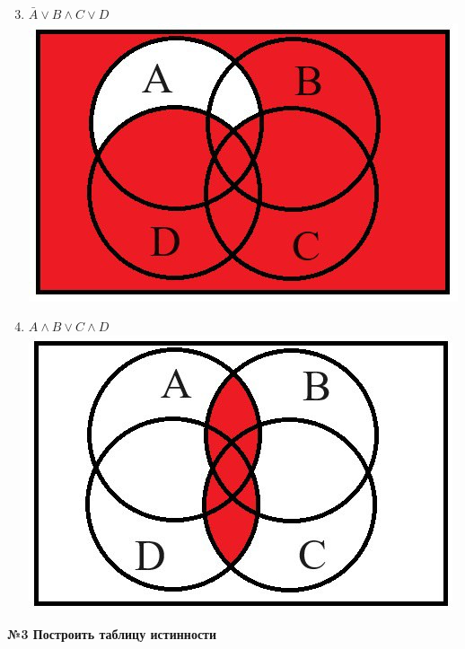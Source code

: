     \begin{minipage}[t]{0.4\textwidth}
        \centering
        \begin{enumerate}
            \setcounter{enumi}{2}
            \item $\bar A \vee B \wedge C \vee D$\\
            \includegraphics[width=1\linewidth]{images/img_4}

            \item $A \wedge B \vee C \wedge D$\\
            \includegraphics[width=1\linewidth]{images/img_5}

        \end{enumerate}
    \end{minipage}

    \begin{center}
        \textbf{№3 Построить таблицу истинности}
    \end{center}

